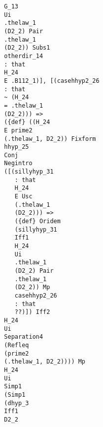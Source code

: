 \documentclass[12pt]{article}
\begin{document}
\begin{verbatim}
                                        G_13 
                                        Ui 
                                        .thelaw_1 
                                        (D2_2) Pair 
                                        .thelaw_1 
                                        (D2_2)) Subs1 
                                        otherdir_14 
                                        : that 
                                        H_24 
                                        E .B112_1)], [(casehhyp2_26 
                                        : that 
                                        ~ (H_24 
                                        = .thelaw_1 
                                        (D2_2))) => 
                                        ({def} ((H_24 
                                        E prime2 
                                        (.thelaw_1, D2_2)) Fixform 
                                        hhyp_25 
                                        Conj 
                                        Negintro 
                                        ([(sillyhyp_31 
                                           : that 
                                           H_24 
                                           E Usc 
                                           (.thelaw_1 
                                           (D2_2))) => 
                                           ({def} Oridem 
                                           (sillyhyp_31 
                                           Iff1 
                                           H_24 
                                           Ui 
                                           .thelaw_1 
                                           (D2_2) Pair 
                                           .thelaw_1 
                                           (D2_2)) Mp 
                                           casehhyp2_26 
                                           : that 
                                           ??)]) Iff2 
                                        H_24 
                                        Ui 
                                        Separation4 
                                        (Refleq 
                                        (prime2 
                                        (.thelaw_1, D2_2)))) Mp 
                                        H_24 
                                        Ui 
                                        Simp1 
                                        (Simp1 
                                        (dhyp_3 
                                        Iff1 
                                        D2_2 

\end{verbatim}
\end{document}
